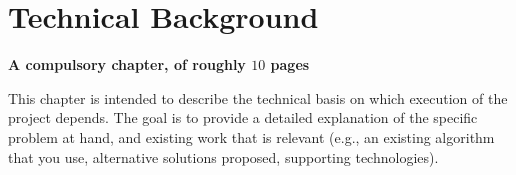 \documentclass[ %
                    author={Tom Jager},
                supervisor={Dr. Daniel Schien},
                    degree={MEng},
                     title={A Bayesian Inference Engine for UMIS Structured Data},
                  subtitle={},
                      type={research},
                      year={2019} ]{dissertation}
\begin{document}

\chapter{Technical Background}
\label{chap:technical}

{\bf A compulsory chapter,     of roughly $10$ pages} 
\vspace{1cm} 

\noindent

This chapter is intended to describe the technical basis on which execution
of the project depends.  The goal is to provide a detailed explanation of
the specific problem at hand, and existing work that is relevant (e.g., an
existing algorithm that you use, alternative solutions proposed, supporting
technologies).  
\end{document}
